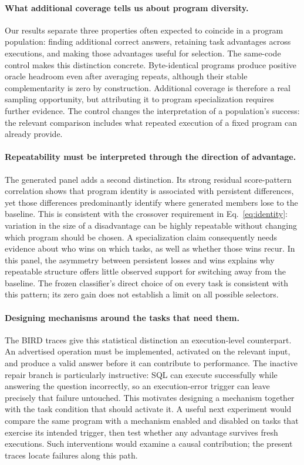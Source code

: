 \paragraph{What additional coverage tells us about program diversity.}
Our results separate three properties often expected to coincide in a
program population: finding additional correct answers, retaining task
advantages across executions, and making those advantages useful for
selection. The same-code control makes this distinction concrete.
Byte-identical programs produce positive oracle headroom even after
averaging repeats, although their stable complementarity is zero by
construction. Additional coverage is therefore a real sampling
opportunity, but attributing it to program specialization requires
further evidence. The control changes the interpretation of a population's
success: the relevant comparison includes what repeated execution of a
fixed program can already provide.

\paragraph{Repeatability must be interpreted through the direction of advantage.}
The generated panel adds a second distinction. Its strong residual
score-pattern correlation shows that program identity is associated with
persistent differences, yet those differences predominantly identify
where generated members lose to the baseline. This is consistent with
the crossover requirement in Eq.~\ref{eq:identity}: variation in the
size of a disadvantage can be highly repeatable without changing which
program should be chosen. A specialization claim consequently needs
evidence about who wins on which tasks, as well as whether those wins
recur. In this panel, the asymmetry between persistent losses and wins
explains why repeatable structure offers little observed support for
switching away from the baseline. The frozen classifier's direct choice
of \bare{} on every task is consistent with this pattern; its zero gain
does not establish a limit on all possible selectors.

\paragraph{Designing mechanisms around the tasks that need them.}
The BIRD traces give this statistical distinction an execution-level
counterpart. An advertised operation must be implemented, activated on
the relevant input, and produce a valid answer before it can contribute
to performance. The inactive repair branch is particularly instructive:
SQL can execute successfully while answering the question incorrectly,
so an execution-error trigger can leave precisely that failure untouched.
This motivates designing a mechanism together with the task condition
that should activate it. A useful next experiment would compare the same
program with a mechanism enabled and disabled on tasks that exercise its
intended trigger, then test whether any advantage survives fresh
executions. Such interventions would examine a causal contribution;
the present traces locate failures along this path.

